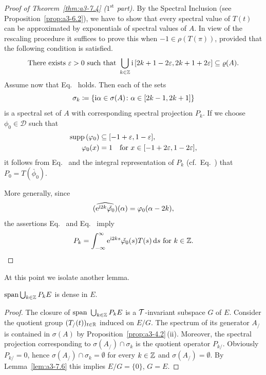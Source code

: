 \begin{proof}[Proof of Theorem~\ref{thm:a3-7.4} ($1^{\text{st}} $ part)]
By the Spectral Inclusion (see Proposition~\ref{prop:a3-6.2}), we have to show that every spectral value of\/ $T(t)$ can be approximated by exponentials of spectral values of\/ $A$.
In view of the rescaling procedure it suffices to prove this when $-1 \in \rho(T(\pi))$, provided that the following condition is satisfied.
\begin{equation}\label{eq:a3-7.4}
	\text{There exists } \epsilon > 0 \text{ such that } \bigcup_{k\in\Z} \im\,[2k+1-2\epsilon,2k+1+2\epsilon] \subseteq 	\rho(A) .
\end{equation}
Assume now that Eq.~ holds.
Then each of the sets 
\[
	\sigma_{k}\coloneq \{\mathrm{i}\alpha \in \sigma(A) \colon \alpha \in [2k-1,2k+1]\}
\] 
is a spectral set of\/ $A$ with corresponding spectral projection $P_{k}$.
If we choose $\phi_{0} \in \mathcal{D}$ such that 
\begin{align*}
	\supp(\phi_{0}) &\subseteq [-1+\epsilon,1-\epsilon], \\
	\phi_{0}(x) & = 1 \quad \text{for $x \in [-1 + 2\epsilon,1 - 2\epsilon]$}, 
\end{align*}
it follows from Eq.~ and the integral representation of\/ $P_{k}$ (cf.\ Eq.~) that $P_{0} = T(\check{\phi_{0}})$.

More generally, since %
\[
	\widehat{\left(\eu^{\im 2k}\check{\phi_{0}}\right)}(\alpha) = \phi_{0}(\alpha-2k) ,
\]
%
the assertions Eq.~ and Eq.~ imply
\begin{equation}\label{eq:a3-7.5}
P_{k} = \int_{-\infty}^{\infty} \eu^{\im 2ks}\check{\phi_{0}}(s)T(s)\ds \text{ for } k \in \Z .
\qedhere
\end{equation}
\end{proof}
At this point we isolate another lemma.
\begin{lemma}\label{lem:a3-7.7}
$\mathrm{span }\bigcup_{k\in\mathbb{Z}} P_{k}E$ is dense in $E$.
\end{lemma}
\begin{proof}
The closure of\/ $\text{span }\bigcup_{k\in\mathbb{Z}} P_{k}E$ is a $\mathcal{T}$-invariant subspace $G$ of\/ $E$.
Consider the quotient group $(T_/(t))_{t\in\mathbb{R}}$ induced on $E/G$.
The spectrum of its generator $A_{/}$ is contained in $\sigma(A)$ by Proposition~\ref{prop:a3-4.2}\,(ii).
Moreover, the spectral projection corresponding to $\sigma(A_{/}) \cap \sigma_{k}$ is the quotient operator $P_{k/}$.
Obviously $P_{k/} = 0$, hence $\sigma(A_{/}) \cap \sigma_{k} = \emptyset$ for every $k \in \mathbb{Z}$ and $\sigma(A_{/}) = \emptyset$.
By Lemma~\ref{lem:a3-7.6} this implies $E/G = \{0\}$, \ie $G = E$.
\end{proof}
